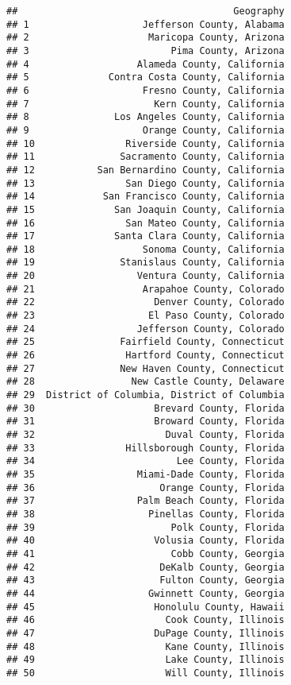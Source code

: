 \documentclass[
]{article}
\begin{document}
\begin{verbatim}
##                                      Geography
## 1                    Jefferson County, Alabama
## 2                     Maricopa County, Arizona
## 3                         Pima County, Arizona
## 4                   Alameda County, California
## 5              Contra Costa County, California
## 6                    Fresno County, California
## 7                      Kern County, California
## 8               Los Angeles County, California
## 9                    Orange County, California
## 10                Riverside County, California
## 11               Sacramento County, California
## 12           San Bernardino County, California
## 13                San Diego County, California
## 14            San Francisco County, California
## 15              San Joaquin County, California
## 16                San Mateo County, California
## 17              Santa Clara County, California
## 18                   Sonoma County, California
## 19               Stanislaus County, California
## 20                  Ventura County, California
## 21                   Arapahoe County, Colorado
## 22                     Denver County, Colorado
## 23                    El Paso County, Colorado
## 24                  Jefferson County, Colorado
## 25               Fairfield County, Connecticut
## 26                Hartford County, Connecticut
## 27               New Haven County, Connecticut
## 28                 New Castle County, Delaware
## 29  District of Columbia, District of Columbia
## 30                     Brevard County, Florida
## 31                     Broward County, Florida
## 32                       Duval County, Florida
## 33                Hillsborough County, Florida
## 34                         Lee County, Florida
## 35                  Miami-Dade County, Florida
## 36                      Orange County, Florida
## 37                  Palm Beach County, Florida
## 38                    Pinellas County, Florida
## 39                        Polk County, Florida
## 40                     Volusia County, Florida
## 41                        Cobb County, Georgia
## 42                      DeKalb County, Georgia
## 43                      Fulton County, Georgia
## 44                    Gwinnett County, Georgia
## 45                     Honolulu County, Hawaii
## 46                       Cook County, Illinois
## 47                     DuPage County, Illinois
## 48                       Kane County, Illinois
## 49                       Lake County, Illinois
## 50                       Will County, Illinois

\end{verbatim}
\end{document}

